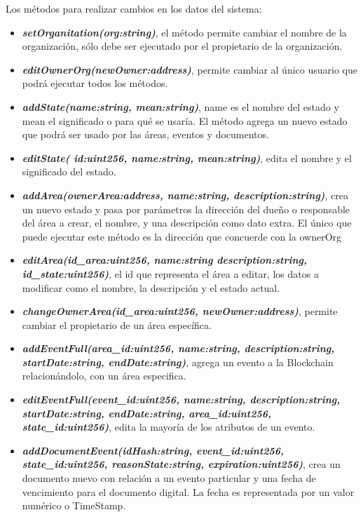     Los métodos para realizar cambios en los datos del sistema:
    \begin{itemize}
      \item \textit{\textbf{setOrganitation(org:string)}}, el método permite cambiar el nombre de la organización, sólo debe ser ejecutado por el propietario de la organización.
      \item \textit{\textbf{editOwnerOrg(newOwner:address)}}, permite cambiar al único usuario que podrá ejecutar todos los métodos.
      \item \textit{\textbf{addState(name:string, mean:string)}}, name es el nombre del estado y mean el significado o para qué se usaría. El método agrega un nuevo estado que podrá ser usado por las áreas, eventos y documentos.
      \item \textit{\textbf{editState( id:uint256, name:string, mean:string)}}, edita el nombre y el significado del estado.
      \item \textit{\textbf{addArea(ownerArea:address, name:string, description:string)}}, crea un nuevo estado y pasa por parámetros la dirección del dueño o responsable del área a crear, el nombre, y una descripción como dato extra. El único que puede ejecutar este método es la dirección que concuerde con la ownerOrg
      \item \textit{\textbf{editArea(id\_area:uint256, name:string description:string, id\_state:uint256)}}, el id que representa el área a editar, los datos a modificar como el nombre, la descripción y el estado actual.
      \item \textit{\textbf{changeOwnerArea(id\_area:uint256, newOwner:address)}}, permite cambiar el propietario de un área específica.
      \item \textit{\textbf{addEventFull(area\_id:uint256, name:string, description:string, startDate:string, endDate:string)}}, agrega un evento a la  Blockchain relacionándolo, con un área especifica.
      \item \textit{\textbf{editEventFull(event\_id:uint256, name:string, description:string, startDate:string, endDate:string, area\_id:uint256, state\_id:uint256)}}, edita la mayoría de los atributos de un evento.
      \item \textit{\textbf{addDocumentEvent(idHash:string, event\_id:uint256, state\_id:uint256, reasonState:string, expiration:uint256)}}, crea un documento nuevo con relación a un evento particular y una fecha de vencimiento para el documento digital. La fecha
      es representada por un valor numérico o \gls{TimeStamp}.

\end{itemize}

